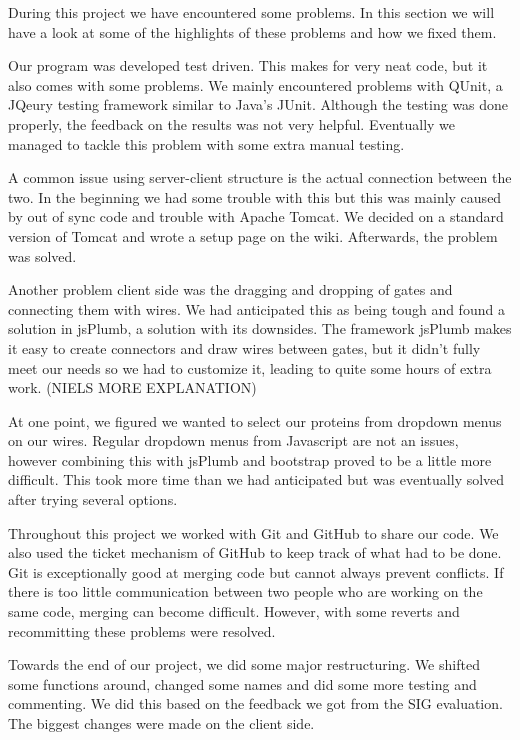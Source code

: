 \documentclass[a4paper]{article}
\begin{document}
During this project we have encountered some problems. In this section we will have a look at some of the highlights of these problems and how we fixed them.

Our program was developed test driven. This makes for very neat code, but it also comes with some problems. We mainly encountered problems with QUnit, a JQeury testing framework similar to Java's JUnit. Although the testing was done properly, the feedback on the results was not very helpful. Eventually we managed to tackle this problem with some extra manual testing.

A common issue using server-client structure is the actual connection between the two. In the beginning we had some trouble with this but this was mainly caused by out of sync code and trouble with Apache Tomcat. We decided on a standard version of Tomcat and wrote a setup page on the wiki. Afterwards, the problem was solved.

Another problem client side was the dragging and dropping of gates and connecting them with wires. We had anticipated this as being tough and found a solution in jsPlumb, a solution with its downsides. The framework jsPlumb makes it easy to create connectors and draw wires between gates, but it didn't fully meet our needs so we had to customize it, leading to quite some hours of extra work. (NIELS MORE EXPLANATION)

At one point, we figured we wanted to select our proteins from dropdown menus on our wires. Regular dropdown menus from Javascript are not an issues, however combining this with jsPlumb and bootstrap proved to be a little more difficult. This took more time than we had anticipated but was eventually solved after trying several options.

Throughout this project we worked with Git and GitHub to share our code. We also used the ticket mechanism of GitHub to keep track of what had to be done. Git is exceptionally good at merging code but cannot always prevent conflicts. If there is too little communication between two people who are working on the same code, merging can become difficult. However, with some reverts and recommitting these problems were resolved.

Towards the end of our project, we did some major restructuring. We shifted some functions around, changed some names and did some more testing and commenting. We did this based on the feedback we got from the SIG evaluation. The biggest changes were made on the client side.
\end{document}
